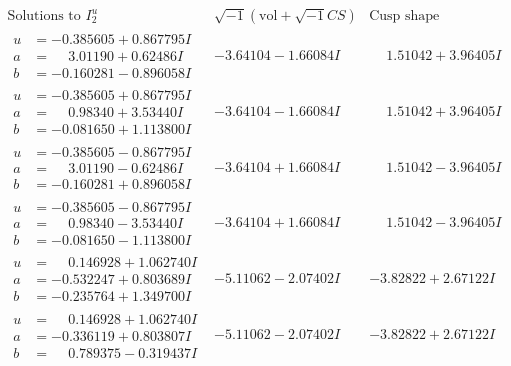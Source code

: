 \documentclass[1p]{elsarticle_modified}
\theoremstyle{definition}
\newcommand{\I}{\sqrt{-1}}
\begin{document}
$$\begin{array}{c|c|c}  
\text{Solutions to }I^u_{2}& \I (\text{vol} + \sqrt{-1}CS) & \text{Cusp shape}\\
 \hline 
\begin{aligned}
u &= -0.385605 + 0.867795 I \\
a &= \phantom{-}3.01190 + 0.62486 I \\
b &= -0.160281 - 0.896058 I\end{aligned}
 & -3.64104 - 1.66084 I & \phantom{-}1.51042 + 3.96405 I \\ \hline\begin{aligned}
u &= -0.385605 + 0.867795 I \\
a &= \phantom{-}0.98340 + 3.53440 I \\
b &= -0.081650 + 1.113800 I\end{aligned}
 & -3.64104 - 1.66084 I & \phantom{-}1.51042 + 3.96405 I \\ \hline\begin{aligned}
u &= -0.385605 - 0.867795 I \\
a &= \phantom{-}3.01190 - 0.62486 I \\
b &= -0.160281 + 0.896058 I\end{aligned}
 & -3.64104 + 1.66084 I & \phantom{-}1.51042 - 3.96405 I \\ \hline\begin{aligned}
u &= -0.385605 - 0.867795 I \\
a &= \phantom{-}0.98340 - 3.53440 I \\
b &= -0.081650 - 1.113800 I\end{aligned}
 & -3.64104 + 1.66084 I & \phantom{-}1.51042 - 3.96405 I \\ \hline\begin{aligned}
u &= \phantom{-}0.146928 + 1.062740 I \\
a &= -0.532247 + 0.803689 I \\
b &= -0.235764 + 1.349700 I\end{aligned}
 & -5.11062 - 2.07402 I & -3.82822 + 2.67122 I \\ \hline\begin{aligned}
u &= \phantom{-}0.146928 + 1.062740 I \\
a &= -0.336119 + 0.803807 I \\
b &= \phantom{-}0.789375 - 0.319437 I\end{aligned}
 & -5.11062 - 2.07402 I & -3.82822 + 2.67122 I \\ \hline\begin{aligned}

\end{aligned}
\end{array}$$
\end{document}
